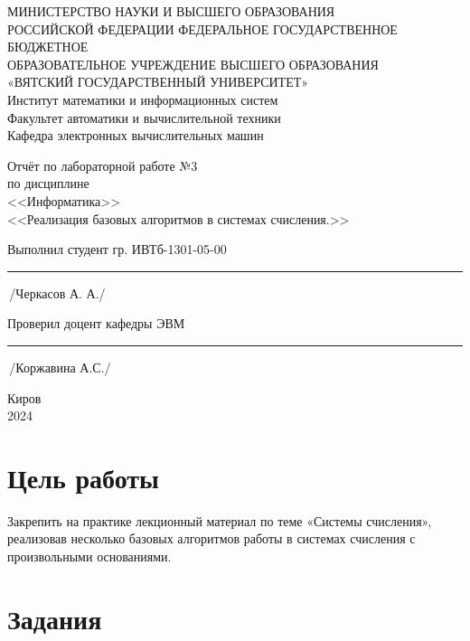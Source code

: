 \documentclass[oneside,a4paper,14pt]{extarticle} %
\begin{document}
\newpage\thispagestyle{empty}
\begin{center}
	МИНИСТЕРСТВО НАУКИ И ВЫСШЕГО ОБРАЗОВАНИЯ\\
	РОССИЙСКОЙ ФЕДЕРАЦИИ
	ФЕДЕРАЛЬНОЕ ГОСУДАРСТВЕННОЕ БЮДЖЕТНОЕ\\
	ОБРАЗОВАТЕЛЬНОЕ
	УЧРЕЖДЕНИЕ ВЫСШЕГО ОБРАЗОВАНИЯ\\
	«ВЯТСКИЙ ГОСУДАРСТВЕННЫЙ УНИВЕРСИТЕТ»\\
	Институт математики и информационных систем\\
	Факультет автоматики и вычислительной техники\\
	Кафедра электронных вычислительных машин
\end{center}
\vspace{20mm}

\begin{center}
	Отчёт по лабораторной работе №3\\
	по дисциплине\\
	<<Информатика>>\\
	<<Реализация базовых алгоритмов в системах счисления.>>\\
\end{center}
\vspace{48mm}

Выполнил студент гр. ИВТб-1301-05-00 \hspace{11mm} \rule[-0,5mm]{30mm}{0.15mm}\,/Черкасов А. А./


Проверил доцент кафедры ЭВМ \hfill  \rule[-0,5mm]{30mm}{0.15mm}\,/Коржавина А.С./

\vfill
\begin{center}
	Киров\\
	2024
\end{center}

\section*{Цель работы}

Закрепить на практике лекционный материал по теме «Системы счисления», реализовав несколько базовых алгоритмов работы в системах счисления с произвольными основаниями.

\section*{Задания}
\end{document}
